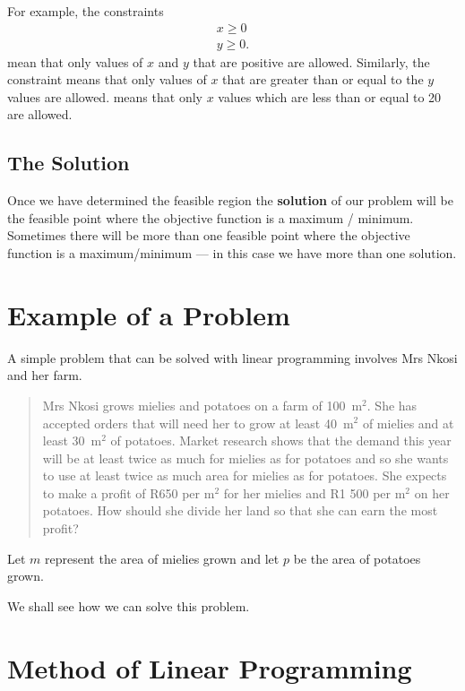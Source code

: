 For example, the constraints
\begin{eqnarray*}
x\geq 0\\
y\geq 0.
\end{eqnarray*}
mean that only values of $x$ and $y$ that are positive are allowed. Similarly, the constraint
means that only values of $x$ that are greater than or equal to the $y$ values are allowed.
means that only $x$ values which are less than or equal to 20 are allowed.


\subsection{The Solution}


Once we have determined the feasible region the \textbf{solution} of our problem will be the feasible point where the objective function is a maximum / minimum. Sometimes there will be more than one feasible point where the objective function is a maximum/minimum --- in this case we have more than one solution. 

\section{Example of a Problem}
A simple problem that can be solved with linear programming involves Mrs Nkosi and her farm. 

\begin{quote}
Mrs Nkosi grows mielies and potatoes on a farm of 100~m$^2$. She has accepted orders that will need her to grow at least 40~m$^2$ of mielies and at least 30~m$^2$ of potatoes. Market research shows that the demand this year will be at least twice as much for mielies as for potatoes and so she wants to use at least twice as much area for mielies as for potatoes. She expects to make a profit of R650 per m$^2$ for her mielies and R1 500 per m$^2$ on her potatoes. How should she divide her land so that she can earn the most profit?
\end{quote}

Let $m$ represent the area of mielies grown and let $p$ be the area of potatoes grown. 

We shall see how we can solve this problem.

\section{Method of Linear Programming}

